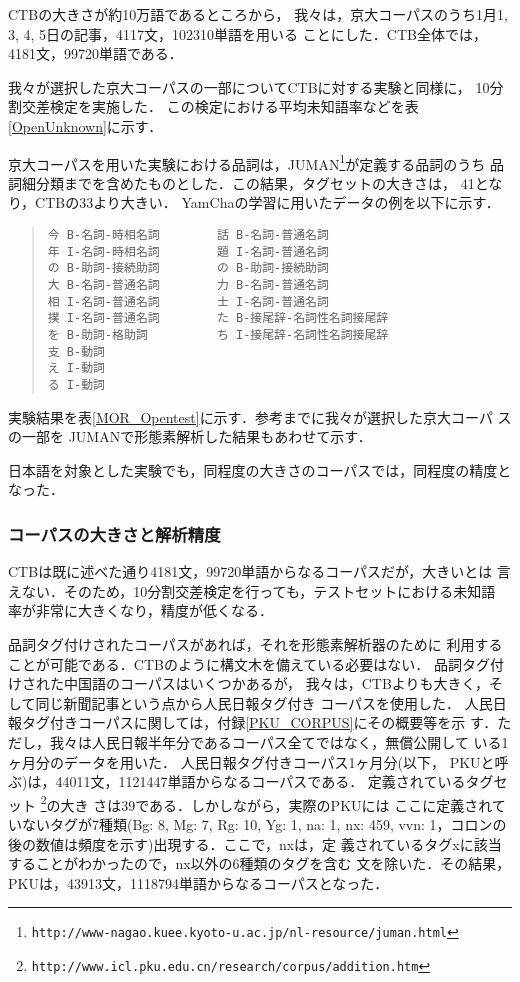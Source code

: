 CTBの大きさが約10万語であるところから，
我々は，京大コーパスのうち1月1, 3, 4, 5日の記事，4117文，102310単語を用いる
ことにした．CTB全体では，4181文，99720単語である．

我々が選択した京大コーパスの一部についてCTBに対する実験と同様に，
10分割交差検定を実施した．
この検定における平均未知語率などを表\ref{OpenUnknown}に示す．

京大コーパスを用いた実験における品詞は，JUMAN\footnote{\tt{http://www-nagao.kuee.kyoto-u.ac.jp/nl-resource/juman.html}}が定義する品詞のうち
品詞細分類までを含めたものとした．この結果，タグセットの大きさは，
41となり，CTBの33より大きい．
YamChaの学習に用いたデータの例を以下に示す．
\vspace*{5mm}

\begin{quote}
\begin{verbatim}
今 B-名詞-時相名詞        話 B-名詞-普通名詞
年 I-名詞-時相名詞        題 I-名詞-普通名詞
の B-助詞-接続助詞        の B-助詞-接続助詞
大 B-名詞-普通名詞        力 B-名詞-普通名詞
相 I-名詞-普通名詞        士 I-名詞-普通名詞
撲 I-名詞-普通名詞        た B-接尾辞-名詞性名詞接尾辞
を B-助詞-格助詞　        ち I-接尾辞-名詞性名詞接尾辞
支 B-動詞
え I-動詞
る I-動詞
\end{verbatim}
\end{quote}

\vspace*{5mm}

実験結果を表\ref{MOR_Opentest}に示す．参考までに我々が選択した京大コーパ
スの一部を JUMANで形態素解析した結果もあわせて示す．

日本語を対象とした実験でも，同程度の大きさのコーパスでは，同程度の精度となった．
\subsubsection{コーパスの大きさと解析精度}
CTBは既に述べた通り4181文，99720単語からなるコーパスだが，大きいとは
言えない．そのため，10分割交差検定を行っても，テストセットにおける未知語
率が非常に大きくなり，精度が低くなる．

品詞タグ付けされたコーパスがあれば，それを形態素解析器のために
利用することが可能である．CTBのように構文木を備えている必要はない．
品詞タグ付けされた中国語のコーパスはいくつかあるが，
我々は，CTBよりも大きく，そして同じ新聞記事という点から人民日報タグ付き
コーパスを使用した．
人民日報タグ付きコーパスに関しては，付録\ref{PKU_CORPUS}にその概要等を示
す．ただし，我々は人民日報半年分であるコーパス全てではなく，無償公開して
いる1ヶ月分のデータを用いた．
人民日報タグ付きコーパス1ヶ月分(以下，
PKUと呼ぶ)は，44011文，1121447単語からなるコーパスである．
定義されているタグセット
\footnote{\tt http://www.icl.pku.edu.cn/research/corpus/addition.htm}の大き
さは39である．しかしながら，実際のPKUには
ここに定義されていないタグが7種類(Bg: 8, Mg: 7, Rg: 10, Yg: 1, na: 1,
nx: 459, vvn: 1，コロンの後の数値は頻度を示す)出現する．ここで，nxは，定
義されているタグxに該当することがわかったので，nx以外の6種類のタグを含む
文を除いた．その結果，PKUは，43913文，1118794単語からなるコーパスとなった．

